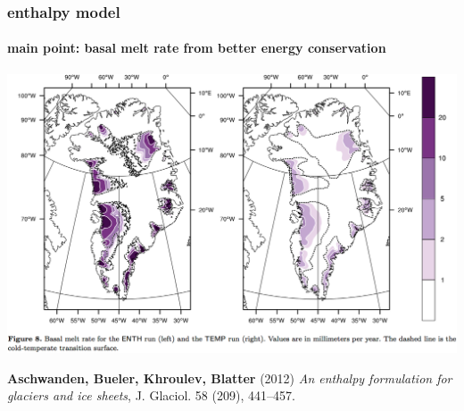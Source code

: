 \documentclass[hide notes,intlimits]{beamer}
\begin{document}
\begin{frame}
  \frametitle{enthalpy model}
  \framesubtitle{main point: basal melt rate from better energy conservation}

  \begin{center}
    \includegraphics[height=0.7\textheight]{enthalpy-model.png}
  \end{center}

\begin{flushleft}
\scriptsize \textbf{Aschwanden, Bueler, Khroulev, Blatter} (2012) \emph{An enthalpy
      formulation for glaciers and ice sheets}, J. Glaciol. 58 (209), 441--457.
\end{flushleft}
\end{frame}
\end{document}
